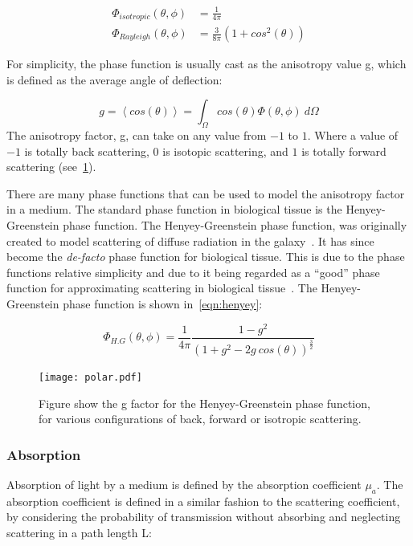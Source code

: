 \begin{align}
	\Phi_{isotropic}(\theta,\phi)&=\frac{1}{4\pi}\\
	\Phi_{Rayleigh}(\theta,\phi)&=\frac{3}{8\pi}(1+cos^2(\theta))
\end{align}

For simplicity, the phase function is usually cast as the anisotropy value g, which is defined as the average angle of deflection:

\begin{equation}
	g=\left<cos(\theta)\right>=\int_{\Omega}cos(\theta)\Phi(\theta,\phi)\ d\Omega
\end{equation}
The anisotropy factor, g, can take on any value from $-1$ to $1$. Where a value of $-1$ is totally back scattering, $0$ is isotopic scattering, and $1$ is totally forward scattering (see~\cref{fig:henyey}).


There are many phase functions that can be used to model the anisotropy factor in a medium. The standard phase function in biological tissue is the Henyey-Greenstein phase function. The Henyey-Greenstein phase function, was originally created to model scattering of diffuse radiation in the galaxy~\cite{lister2012optical,henyey1941diffuse}. It has since become the \textit{de-facto} phase function for biological tissue. This is due to the phase functions relative simplicity and due to it being regarded as a ``good'' phase function for approximating scattering in biological tissue~\cite{jacques1987angular}.
The Henyey-Greenstein phase function is shown in~\cref{eqn:henyey}:

\begin{equation}
	\Phi_{H.G}(\theta,\phi)=\frac{1}{4\pi}\frac{1-g^2}{(1+g^2-2g\ cos(\theta))^{\tfrac{3}{2}}}
	\label{eqn:henyey}
\end{equation}

\begin{figure}
	\centering
	\texttt{[image: polar.pdf]}
	\caption{Figure show the g factor for the Henyey-Greenstein phase function, for various configurations of back, forward or isotropic scattering.}
	\label{fig:henyey}
\end{figure}

\subsubsection*{Absorption}\label{sec:absor}

Absorption of light by a medium is defined by the absorption coefficient $\mu_a$. The absorption coefficient is defined in a similar fashion to the scattering coefficient, by considering the probability of transmission without absorbing and neglecting scattering in a path length L:

